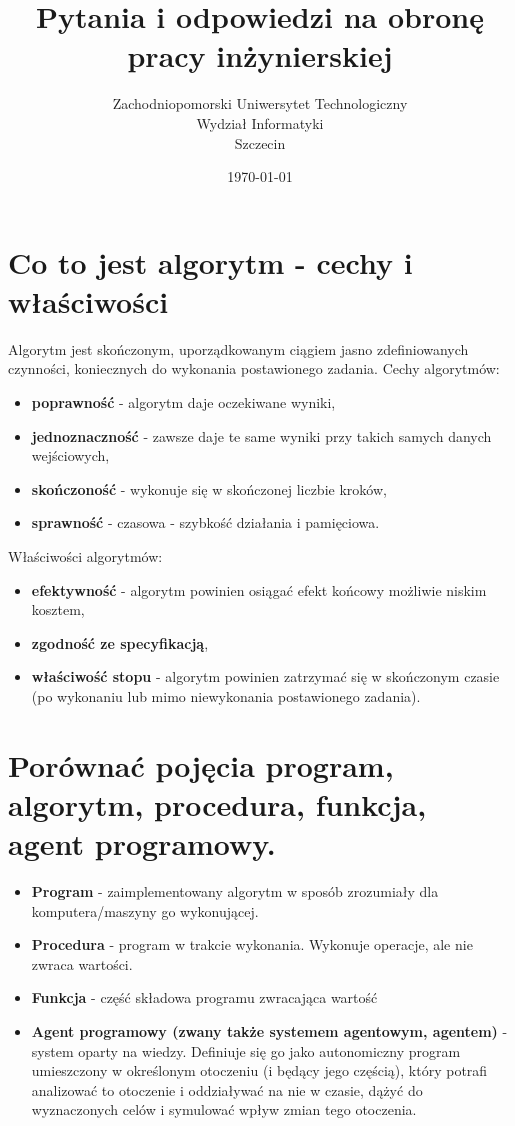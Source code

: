 \documentclass[12pt,a4paper]{article}
\title{Pytania i odpowiedzi na obronę pracy inżynierskiej}
\author{
	Zachodniopomorski Uniwersytet Technologiczny\\
	Wydział Informatyki\\
	Szczecin
}
\date{\today}
\begin{document}
	\maketitle

	\section{Co to jest algorytm - cechy i właściwości}
	Algorytm jest skończonym, uporządkowanym ciągiem jasno zdefiniowanych czynności, koniecznych do wykonania postawionego  zadania.
	Cechy algorytmów:
	\begin{itemize}
		\item \textbf{poprawność} - algorytm daje oczekiwane wyniki,
		\item \textbf{jednoznaczność} - zawsze daje te same wyniki przy takich samych danych wejściowych,
		\item \textbf{skończoność} - wykonuje się w skończonej liczbie kroków,
		\item \textbf{sprawność} - czasowa - szybkość działania i pamięciowa.
	\end{itemize}
	Właściwości algorytmów:
	\begin{itemize}
		\item \textbf{efektywność} - algorytm powinien osiągać efekt końcowy możliwie niskim kosztem,
		\item \textbf{zgodność ze specyfikacją},
		\item \textbf{właściwość stopu} - algorytm powinien zatrzymać się w skończonym czasie (po wykonaniu lub mimo niewykonania postawionego zadania).
	\end{itemize}

	\section{Porównać pojęcia program, algorytm, procedura, funkcja, agent programowy.}
	\begin{itemize}
		\item \textbf{Program} - zaimplementowany algorytm w sposób zrozumiały dla komputera/maszyny go wykonującej.
		\item\textbf{ Procedura} - program w trakcie wykonania. Wykonuje operacje, ale nie zwraca wartości.
		\item \textbf{Funkcja} - część składowa programu zwracająca wartość
		\item \textbf{Agent programowy (zwany także systemem agentowym, agentem)} - system oparty na wiedzy. Definiuje się go jako autonomiczny program umieszczony w określonym otoczeniu (i będący jego częścią), który potrafi analizować to otoczenie i oddziaływać na nie w czasie, dążyć do wyznaczonych celów i symulować wpływ zmian tego otoczenia.
	\end{itemize}
\end{document}
